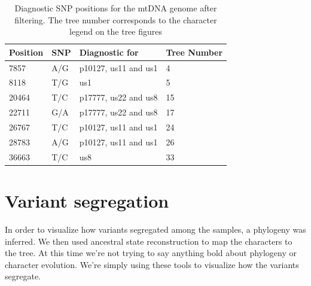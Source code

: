 \documentclass{article}\usepackage[]{graphicx}\usepackage[]{color}
\begin{document}




\begin{table}[h!]
\centering
\caption{Diagnostic SNP positions for the mtDNA genome after filtering. The tree number corresponds to the character legend on the tree figures}
\begin{tabular}{@{}llll@{}}
\toprule
Position & SNP & Diagnostic for & Tree Number      \\
\midrule
7857     & A/G & p10127, us11 and us1 & 4\\
8118     & T/G & us1                  & 5\\
20464    & T/C & p17777, us22 and us8 & 15\\
22711    & G/A & p17777, us22 and us8 & 17\\
26767    & T/C & p10127, us11 and us1 & 24\\
28783    & A/G & p10127, us11 and us1 & 26\\
36663    & T/C & us8 & 33                  \\
\bottomrule
\end{tabular}
\label{table:DiagSNP}
\end{table}


\section{Variant segregation}

In order to visualize how variants segregated among the samples, a phylogeny was inferred.  We then used ancestral state reconstruction to map the characters to the tree.  At this time we're not trying to say anything bold about phylogeny or character evolution.  We're simply using these tools to visualize how the variants segregate.
\end{document}
